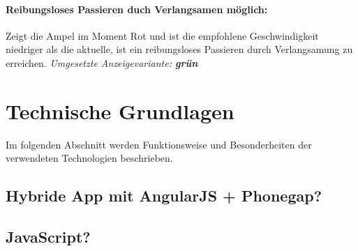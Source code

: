 \paragraph{Reibungsloses Passieren duch Verlangsamen möglich:} Zeigt die Ampel im Moment Rot und ist die empfohlene Geschwindigkeit niedriger als die aktuelle, ist ein reibungsloses Passieren durch Verlangsamung zu erreichen.
\textit{Umgesetzte Anzeigevariante: \textbf{grün}}
\section{Technische Grundlagen}
Im folgenden Abschnitt werden Funktionsweise und Besonderheiten der verwendeten Technologien beschrieben.
\subsection{Hybride App mit AngularJS + Phonegap?}
\subsection{JavaScript?}
